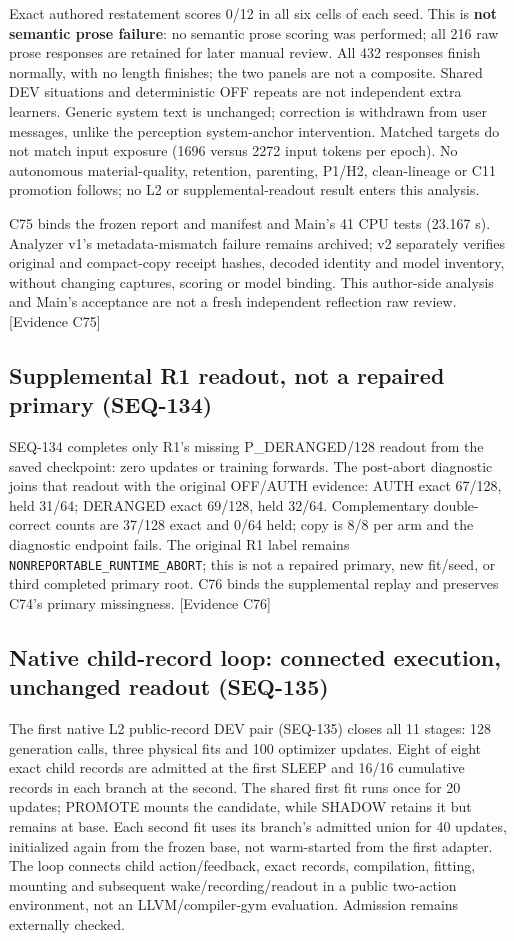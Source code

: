 \documentclass[11pt]{article}
\newcommand{\ev}[1]{\textsf{[Evidence #1]}}
\begin{document}
Exact authored restatement scores 0/12 in all six cells of each seed. This is
\textbf{not semantic prose failure}: no semantic prose scoring was performed;
all 216 raw prose responses are retained for later manual review. All 432 responses
finish normally, with no length finishes; the two panels are not a composite.
Shared DEV situations and deterministic OFF repeats are not independent extra
learners. Generic system text is unchanged; correction is withdrawn from user
messages, unlike the perception system-anchor intervention. Matched targets do
not match input exposure (1696 versus 2272 input tokens per epoch). No autonomous
material-quality, retention, parenting, P1/H2, clean-lineage or C11 promotion
follows; no L2 or supplemental-readout result enters this analysis.

C75 binds the frozen report and manifest and Main's 41 CPU tests (23.167 s).
Analyzer v1's metadata-mismatch failure remains archived; v2 separately verifies
original and compact-copy receipt hashes, decoded identity and model inventory,
without changing captures, scoring or model binding. This author-side analysis
and Main's acceptance are not a fresh independent reflection raw review. \ev{C75}

\subsection{Supplemental R1 readout, not a repaired primary (SEQ-134)}
SEQ-134 completes only R1's missing P\_DERANGED/128 readout from the saved
checkpoint: zero updates or training forwards. The post-abort diagnostic joins
that readout with the original OFF/AUTH evidence: AUTH exact 67/128, held 31/64;
DERANGED exact 69/128, held 32/64. Complementary double-correct counts are 37/128
exact and 0/64 held; copy is 8/8 per arm and the diagnostic endpoint fails.
The original R1 label remains \texttt{NONREPORTABLE\_RUNTIME\_ABORT}; this is
not a repaired primary, new fit/seed, or third completed primary root. C76
binds the supplemental replay and preserves C74's primary missingness. \ev{C76}

\subsection{Native child-record loop: connected execution, unchanged readout (SEQ-135)}
The first native L2 public-record DEV pair (SEQ-135) closes all 11 stages:
128 generation calls, three physical fits and 100 optimizer updates. Eight of
eight exact child records are admitted at the first SLEEP and 16/16 cumulative
records in each branch at the second. The shared first fit runs once for 20
updates; PROMOTE mounts the candidate, while SHADOW retains it but remains at
base. Each second fit uses its branch's admitted union for 40 updates, initialized
again from the frozen base, not warm-started from the first adapter. The loop
connects child action/feedback, exact records, compilation, fitting, mounting
and subsequent wake/recording/readout in a public two-action environment, not
an LLVM/compiler-gym evaluation. Admission remains externally checked.
\end{document}

